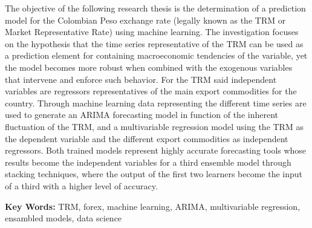 \normalsize
The objective of the following research thesis is the determination of a prediction model for the Colombian Peso exchange rate (legally known as the TRM or Market Representative Rate) using machine learning. The investigation focuses on the hypothesis that the time series representative of the TRM can be used as a prediction element for containing macroeconomic tendencies of the variable, yet the model becomes more robust when combined with the exogenous variables that intervene and enforce such behavior. For the TRM said independent variables are regressors representatives of the main export commodities for the country. Through machine learning data representing the different time series are used to generate an ARIMA forecasting model in function of the inherent fluctuation of the TRM, and a multivariable regression model using the TRM as the dependent variable and the different export commodities as independent regressors. Both trained models represent highly accurate forecasting tools whose results become the independent variables for a third ensemble model through stacking techniques, where the output of the first two learners become the input of a third with a higher level of accuracy.

\textbf{Key Words:} TRM, forex, machine learning, ARIMA, multivariable regression, ensambled models, data science
